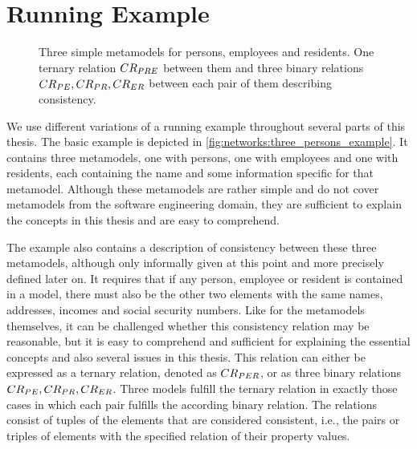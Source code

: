 


\section{Running Example}
\label{chap:networks:example}


\begin{figure}
    \centering
    
    \caption[Three metamodels with exemplary consistency relations]{Three simple metamodels for persons, employees and residents. One ternary relation $CR_{PRE}$ between them and three binary relations $CR_{PE}, CR_{PR}, CR_{ER}$ between each pair of them describing consistency.}
    \label{fig:networks:three_persons_example}
\end{figure}

We use different variations of a running example throughout several parts of this thesis.
The basic example is depicted in \autoref{fig:networks:three_persons_example}.
It contains three metamodels, one with persons, one with employees and one with residents, each containing the name and some information specific for that metamodel.
Although these metamodels are rather simple and do not cover metamodels from the software engineering domain, they are sufficient to explain the concepts in this thesis and are easy to comprehend.

The example also contains a description of consistency between these three metamodels, although only informally given at this point and more precisely defined later on.
It requires that if any person, employee or resident is contained in a model, there must also be the other two elements with the same names, addresses, incomes and social security numbers.
Like for the metamodels themselves, it can be challenged whether this consistency relation may be reasonable, but it is easy to comprehend and sufficient for explaining the essential concepts and also several issues in this thesis.
This relation can either be expressed as a ternary relation, denoted as $CR_{PER}$, or as three binary relations $CR_{PE}, CR_{PR}, CR_{ER}$.
Three models fulfill the ternary relation in exactly those cases in which each pair fulfills the according binary relation.
The relations consist of tuples of the elements that are considered consistent, i.e., the pairs or triples of elements with the specified relation of their property values.

